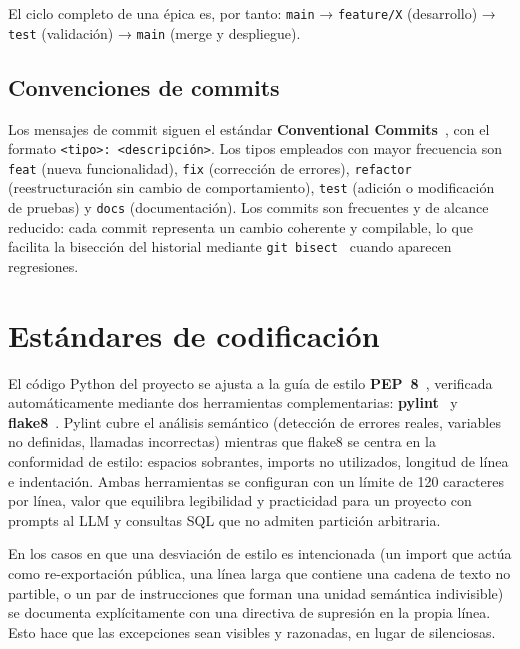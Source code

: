 El ciclo completo de una épica es, por tanto: \texttt{main} → \texttt{feature/X} (desarrollo) → \texttt{test} (validación) → \texttt{main} (merge y despliegue).

\subsection{Convenciones de commits}

Los mensajes de commit siguen el estándar \textbf{Conventional Commits}~\cite{conventionalcommits}, con el formato \texttt{<tipo>: <descripción>}. Los tipos empleados con mayor frecuencia son \texttt{feat} (nueva funcionalidad), \texttt{fix} (corrección de errores), \texttt{refactor} (reestructuración sin cambio de comportamiento), \texttt{test} (adición o modificación de pruebas) y \texttt{docs} (documentación). Los commits son frecuentes y de alcance reducido: cada commit representa un cambio coherente y compilable, lo que facilita la bisección del historial mediante \texttt{git bisect}~\cite{chacon2014pro} cuando aparecen regresiones.

\section{Estándares de codificación}
\label{sec:estandares}

El código Python del proyecto se ajusta a la guía de estilo \textbf{PEP~8}~\cite{pep8}, verificada automáticamente mediante dos herramientas complementarias: \textbf{pylint}~\cite{pylint} y \textbf{flake8}~\cite{flake8}. Pylint cubre el análisis semántico (detección de errores reales, variables no definidas, llamadas incorrectas) mientras que flake8 se centra en la conformidad de estilo: espacios sobrantes, imports no utilizados, longitud de línea e indentación. Ambas herramientas se configuran con un límite de 120 caracteres por línea, valor que equilibra legibilidad y practicidad para un proyecto con prompts al LLM y consultas SQL que no admiten partición arbitraria.

En los casos en que una desviación de estilo es intencionada (un import que actúa como re-exportación pública, una línea larga que contiene una cadena de texto no partible, o un par de instrucciones que forman una unidad semántica indivisible) se documenta explícitamente con una directiva de supresión en la propia línea. Esto hace que las excepciones sean visibles y razonadas, en lugar de silenciosas.

